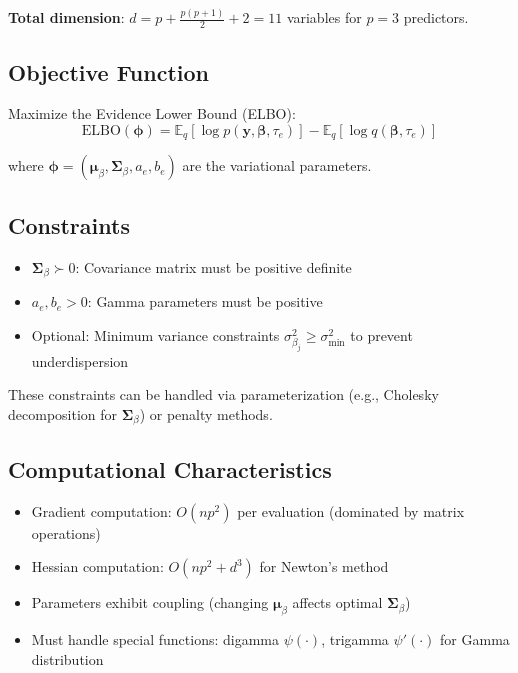 \documentclass[11pt]{article}
\newcommand{\E}{\mathbb{E}}
\newcommand{\ELBO}{\text{ELBO}}
\begin{document}
\textbf{Total dimension}: $d = p + \frac{p(p+1)}{2} + 2 = 11$ variables for $p=3$ predictors.

\subsection{Objective Function}

Maximize the Evidence Lower Bound (ELBO):
\begin{equation}
\ELBO(\bm{\phi}) = \E_q[\log p(\bm{y}, \bm{\beta}, \tau_e)] - \E_q[\log q(\bm{\beta}, \tau_e)]
\end{equation}

where $\bm{\phi} = (\bm{\mu}_\beta, \bm{\Sigma}_\beta, a_e, b_e)$ are the variational parameters.

\subsection{Constraints}

\begin{itemize}
\item $\bm{\Sigma}_\beta \succ 0$: Covariance matrix must be positive definite
\item $a_e, b_e > 0$: Gamma parameters must be positive
\item Optional: Minimum variance constraints $\sigma^2_{\beta_j} \geq \sigma^2_{\text{min}}$ to prevent underdispersion
\end{itemize}

These constraints can be handled via parameterization (e.g., Cholesky decomposition for $\bm{\Sigma}_\beta$) or penalty methods.

\subsection{Computational Characteristics}

\begin{itemize}
\item Gradient computation: $O(np^2)$ per evaluation (dominated by matrix operations)
\item Hessian computation: $O(np^2 + d^3)$ for Newton's method
\item Parameters exhibit coupling (changing $\bm{\mu}_\beta$ affects optimal $\bm{\Sigma}_\beta$)
\item Must handle special functions: digamma $\psi(\cdot)$, trigamma $\psi'(\cdot)$ for Gamma distribution
\end{itemize}
\end{document}

